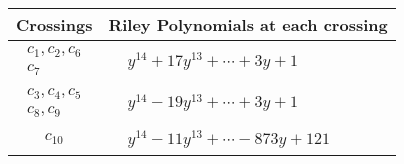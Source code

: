 \documentclass[1p]{elsarticle_modified}
\theoremstyle{definition}
\begin{document}
\begin{tabular}{m{50pt}|m{274pt}}
Crossings & \hspace{64pt}Riley Polynomials at each crossing \\
\hline $$\begin{aligned}c_{1},c_{2},c_{6}\\c_{7}\end{aligned}$$&$\begin{aligned}
&y^{14}+17 y^{13}+\cdots+3 y+1
\end{aligned}$\\
\hline $$\begin{aligned}c_{3},c_{4},c_{5}\\c_{8},c_{9}\end{aligned}$$&$\begin{aligned}
&y^{14}-19 y^{13}+\cdots+3 y+1
\end{aligned}$\\
\hline $$\begin{aligned}c_{10}\end{aligned}$$&$\begin{aligned}
&y^{14}-11 y^{13}+\cdots-873 y+121
\end{aligned}$\\
\hline
\end{tabular}
\vskip 2pc
\end{document}
